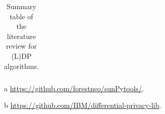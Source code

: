 \begin{landscape}
\begin{table}[ht]
\begin{threeparttable}
\begin{tabular}{rllllllll}
        \bottomrule
      \end{tabular}
      \begin{tablenotes}
        \item[a] \url{https://github.com/forestneo/sunPytools/}.
        \item[b] \url{https://github.com/IBM/differential-privacy-lib}.
      \end{tablenotes}
    \end{threeparttable}

    \caption{Summary table of the literature review for (L)DP algorithms.}
    \label{tab:summary_table_dp}
  \end{table}

  \begin{table}
    \centering


\end{table}
\end{landscape}
